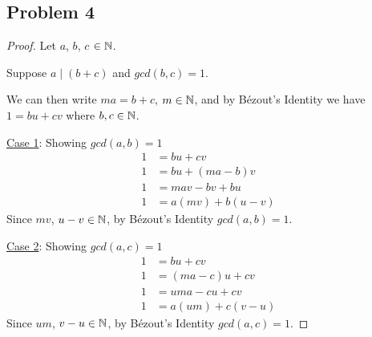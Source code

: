 \documentclass[10pt]{article}
\begin{document}
\subsection*{Problem 4}

\begin{proof}
  Let $a$, $b$, $c$ $\in \mathbb{N}$. \spacing

  \noindent
  Suppose $a \mid (b + c)$ and $gcd(b, c) = 1$.
  \spacing

  \noindent
  We can then write $ma = b + c$, $m \in \mathbb{N}$, and by Bézout's Identity we have $1 = bu + cv$
  where $b, c \in \mathbb{N}$.
  \spacing

  \noindent
  \underline{Case 1}: Showing $gcd(a, b) = 1$
  \begin{align*}
    1 &= bu + cv \\
    1 &= bu + (ma - b)v \\
    1 &= mav - bv + bu \\
    1 &= a(mv) + b(u - v)
  \end{align*}
  Since $mv$, $u - v \in \mathbb{N}$, by Bézout's Identity $gcd(a, b) = 1$.
  \spacing

  \noindent
  \underline{Case 2}: Showing $gcd(a, c) = 1$
  \begin{align*}
    1 &= bu + cv \\
    1 &= (ma - c)u + cv \\
    1 &= uma - cu + cv \\
    1 &= a(um) + c(v - u)
  \end{align*}
  Since $um$, $v - u \in \mathbb{N}$, by Bézout's Identity $gcd(a, c) = 1$.
\end{proof}
\end{document}
